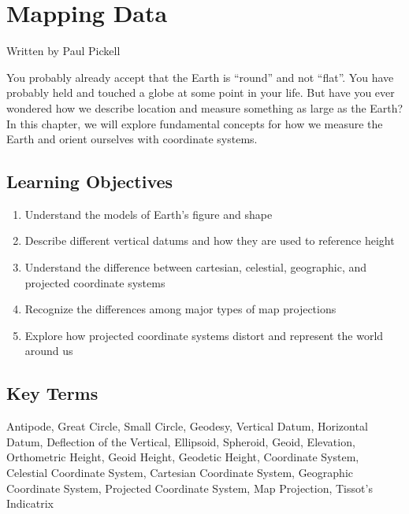 \documentclass[
]{book}
\providecommand{\tightlist}{%
  \setlength{\itemsep}{0pt}\setlength{\parskip}{0pt}}
\begin{document}
\hypertarget{mapping-data}{%
\chapter{Mapping Data}\label{mapping-data}}

Written by
Paul Pickell

You probably already accept that the Earth is ``round'' and not ``flat''. You have probably held and touched a globe at some point in your life. But have you ever wondered how we describe location and measure something as large as the Earth? In this chapter, we will explore fundamental concepts for how we measure the Earth and orient ourselves with coordinate systems.

\hypertarget{learning-objectives-1}{%
\section*{Learning Objectives}\label{learning-objectives-1}}

\begin{enumerate}
\def\labelenumi{\arabic{enumi}.}
\tightlist
\item
  Understand the models of Earth's figure and shape
\item
  Describe different vertical datums and how they are used to reference height
\item
  Understand the difference between cartesian, celestial, geographic, and projected coordinate systems
\item
  Recognize the differences among major types of map projections
\item
  Explore how projected coordinate systems distort and represent the world around us
\end{enumerate}

\hypertarget{key-terms-1}{%
\section*{Key Terms}\label{key-terms-1}}

Antipode, Great Circle, Small Circle, Geodesy, Vertical Datum, Horizontal Datum, Deflection of the Vertical, Ellipsoid, Spheroid, Geoid, Elevation, Orthometric Height, Geoid Height, Geodetic Height, Coordinate System, Celestial Coordinate System, Cartesian Coordinate System, Geographic Coordinate System, Projected Coordinate System, Map Projection, Tissot's Indicatrix
\end{document}
